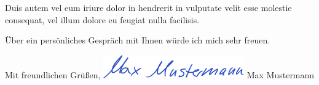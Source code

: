 \documentclass%
  [fontsize=11pt,%
   paper=a4,%
   headsepline=off,%
   parskip=half,%
   fromalign=right,%
   fromphone=on,%
   fromrule=aftername,%
   fromfax=off,%
   fromemail=on,%
   fromurl=off,%
   fromlogo=on,%
   addrfield=on,%
   backaddress=on,%
   subject=beforeopening,%
   locfield=narrow,%
   foldmarks=off,%
   numericaldate=off,%
   refline=narrow,%
   firstfoot=on,%
   draft=off%
]{scrlttr2}
\begin{document}
\begin{letter}
Duis autem vel eum iriure dolor in hendrerit in vulputate velit esse molestie consequat, vel illum dolore eu feugiat nulla facilisis.   


Über ein persönliches Gespräch mit Ihnen würde ich mich sehr freuen.\newline

Mit freundlichen Grüßen,\newline
\includegraphics[height=1cm]{signature.png} \newline
Max Mustermann

\end{letter}
\end{document}
